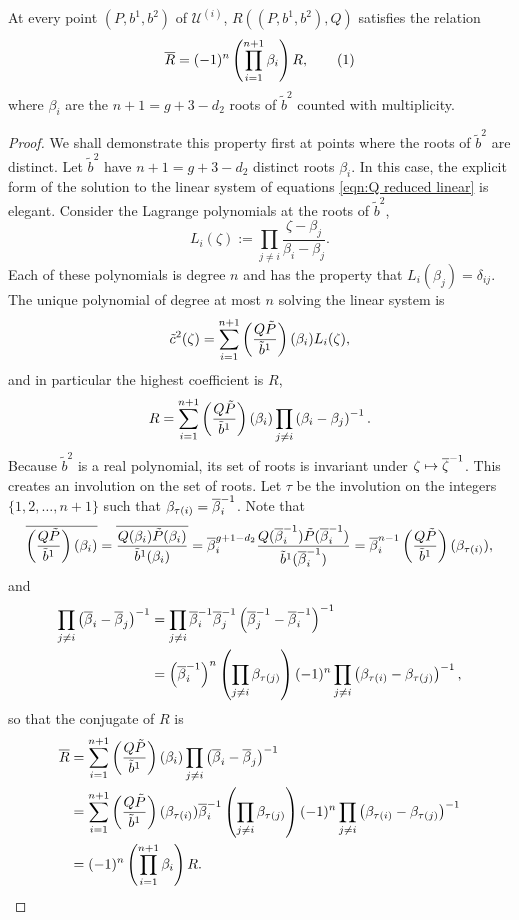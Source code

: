 \documentclass{article}
\begin{document}
\begin{lem}
At every point $(P,b^1,b^2)$ of $\mathcal{U}^{(i)}$, $R((P,b^1,b^2), Q)$ satisfies the relation
\[
\bar{R} = (-1)^{n}\bra{ \prod_{i=1}^{n+1}  \beta_i }  R,
\labelthis{eqn:R reality}
\]
where $\beta_i$ are the $n+1 = g+3 - d_2$ roots of $\tilde{b}^2$ counted with multiplicity.

\begin{proof}
We shall demonstrate this property first at points where the roots of $\tilde{b}^2$ are distinct. Let $\tilde{b}^2$ have $n+1 = g+3 - d_2$ distinct roots $\beta_i$. In this case, the explicit form of the solution to the linear system of equations \eqref{eqn:Q reduced linear} is elegant. Consider the Lagrange polynomials at the roots of $\tilde{b}^2$,
\[
L_i (\zeta) := \prod_{j \neq i} \frac{\zeta-\beta_j}{\beta_i - \beta_j}.
\]
Each of these polynomials is degree $n$ and has the property that $L_i (\beta_j) = \delta_{ij}$. The unique polynomial of degree at most $n$ solving the linear system is
\[
\tilde{c}^2(\zeta) = \sum_{i = 1}^{n+1} \left(\frac{Q\tilde{P}}{\tilde{b}^1}\right)(\beta_{i}) L_i (\zeta),
\]
and in particular the highest coefficient is $R$,
\[
R = \sum_{i = 1}^{n+1} \left(\frac{Q\tilde{P}}{\tilde{b}^1}\right)(\beta_i) \prod_{j \neq i} \left( \beta_i - \beta_j \right)^{-1}.
\]
Because $\tilde{b}^2$ is a real polynomial, its set of roots is invariant under $\zeta \mapsto \overline{\zeta}^{-1}$. This creates an involution on the set of roots. Let $\tau$ be the involution on the integers $\{1,2,\ldots,n+1\}$ such that $\beta_{\tau(i)} = \overline{\beta}^{-1}_i$. Note that
\[
\overline{ \left(\frac{Q\tilde{P}}{\tilde{b}^1}\right)(\beta_{i}) }
= \overline{\frac{Q(\beta_i)\tilde{P}(\beta_i)}{\tilde{b}^1(\beta_i)}}
= \overline{\beta}_i^{g+1 - d_2} \frac{Q(\overline{\beta}^{-1}_i)\tilde{P}(\overline{\beta}^{-1}_i)}{\tilde{b}^1(\overline{\beta}^{-1}_i)}
= \overline{\beta}_i^{n-1} \left(\frac{Q\tilde{P}}{\tilde{b}^1}\right)(\beta_{\tau(i)}),
\]
and
\begin{align*}
\prod_{j \neq i} \left( \overline{\beta}_i - \overline{\beta}_j \right)^{-1}
&= \prod_{j \neq i} \overline{\beta}^{-1}_i \overline{\beta}^{-1}_j \left( \overline{\beta}^{-1}_j - \overline{\beta}^{-1}_i \right)^{-1} \\
&= \left( \overline{\beta}^{-1}_i \right)^{n} \left( \prod_{j \neq i}  \beta_{\tau(j)}\right) (-1)^{n} \prod_{j \neq i}\left( \beta_{\tau(i)} - \beta_{\tau(j)} \right)^{-1},
\end{align*}
so that the conjugate of $R$ is
\begin{align*}
\overline{R}
&= \sum_{i = 1}^{n+1} \left(\frac{Q\tilde{P}}{\tilde{b}^1}\right)(\beta_{i}) \prod_{j \neq i} \left( \overline{\beta}_i - \overline{\beta}_j \right)^{-1} \\
&= \sum_{i = 1}^{n+1} \left(\frac{Q\tilde{P}}{\tilde{b}^1}\right)(\beta_{\tau(i)})
\overline{\beta}^{-1}_i \left( \prod_{j \neq i}  \beta_{\tau(j)}\right) (-1)^{n} \prod_{j \neq i}\left( \beta_{\tau(i)} - \beta_{\tau(j)} \right)^{-1} \\
&= (-1)^{n}\left( \prod_{i=1}^{n+1}  \beta_i \right)  R.
\end{align*}


\end{proof}
\end{lem}
\end{document}
